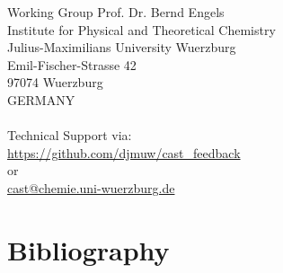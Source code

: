\documentclass[10pt,a4paper]{article} %
\begin{document}
	Working Group Prof. Dr. Bernd Engels\\
	Institute for Physical and Theoretical Chemistry\\
	Julius-Maximilians University Wuerzburg\\
	Emil-Fischer-Strasse 42\\
	97074 Wuerzburg\\
	GERMANY\\~\\
	Technical Support via:\\
	\url{https://github.com/djmuw/cast_feedback}\\
	or\\
	\href{mailto:cast@chemie.uni-wuerzburg.de}{cast@chemie.uni-wuerzburg.de}\\

	\newpage
	\section{Bibliography}
	\printbibliography
\end{document}
